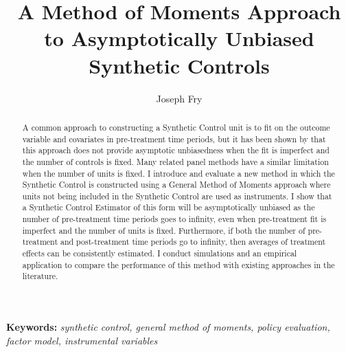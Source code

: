 \documentclass{article}
\begin{document}
\doublespacing%
\title{A Method of Moments Approach to Asymptotically Unbiased Synthetic Controls}
\author[]{Joseph Fry}  
\date{}
\maketitle

\begin{abstract}
    A common approach to constructing a Synthetic Control unit is to fit on the outcome variable and covariates in pre-treatment time periods, but it has been shown by \cite{ImperfectFit} that this approach does not provide asymptotic unbiasedness when the fit is imperfect and the number of controls is fixed. Many related panel methods have a similar limitation when the number of units is fixed. I introduce and evaluate a new method in which the Synthetic Control is constructed using a General Method of Moments approach where units not being included in the Synthetic Control are used as instruments. I show that a Synthetic Control Estimator of this form will be asymptotically unbiased as the number of pre-treatment time periods goes to infinity, even when pre-treatment fit is imperfect and the number of units is fixed. Furthermore, if both the number of pre-treatment and post-treatment time periods go to infinity, then averages of treatment effects can be consistently estimated. I conduct simulations and an empirical application to compare the performance of this method with existing approaches in the literature.
\end{abstract}
\par \textbf{Keywords: }\textit{synthetic control, general method of moments, policy evaluation, factor model, instrumental variables}
\end{document}
